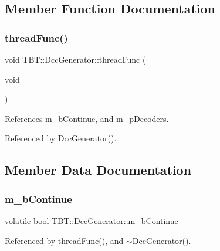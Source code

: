 \subsection{Member Function Documentation}
\mbox{\label{classTBT_1_1DccGenerator_ac2053051903fef00b69152184fa6f47d_ac2053051903fef00b69152184fa6f47d}} 
\subsubsection{\texorpdfstring{thread\+Func()}{threadFunc()}}
{\footnotesize\ttfamily void T\+B\+T\+::\+Dcc\+Generator\+::thread\+Func (\begin{DoxyParamCaption}\item[{void}]{ }\end{DoxyParamCaption})\hspace{0.3cm}{\ttfamily [private]}}



References m\+\_\+b\+Continue, and m\+\_\+p\+Decoders.



Referenced by Dcc\+Generator().



\subsection{Member Data Documentation}
\mbox{\label{classTBT_1_1DccGenerator_a0d045ceb64e3ceece497459776d7d504_a0d045ceb64e3ceece497459776d7d504}} 
\subsubsection{\texorpdfstring{m\+\_\+b\+Continue}{m\_bContinue}}
{\footnotesize\ttfamily volatile bool T\+B\+T\+::\+Dcc\+Generator\+::m\+\_\+b\+Continue\hspace{0.3cm}{\ttfamily [private]}}



Referenced by thread\+Func(), and $\sim$\+Dcc\+Generator().

